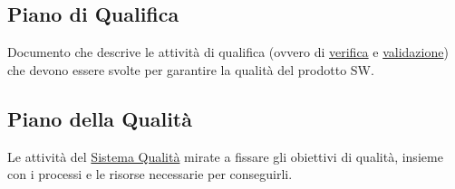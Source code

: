     \subsection{Piano di Qualifica}
    \label{glossario:pianodiqualifica}
    Documento che descrive le attività di qualifica (ovvero di \hyperref[glossario:verifica]{verifica} e \hyperref[glossario:validazione]{validazione}) che devono essere svolte per garantire la qualità del prodotto SW.

    \subsection{Piano della Qualità}
    \label{glossario:pianodellaqualita}
    Le attività del \hyperref[glossario:sistemaqualita]{Sistema Qualità} mirate a fissare gli obiettivi di qualità, insieme con i processi e le risorse necessarie per conseguirli.
        
\pagebreak